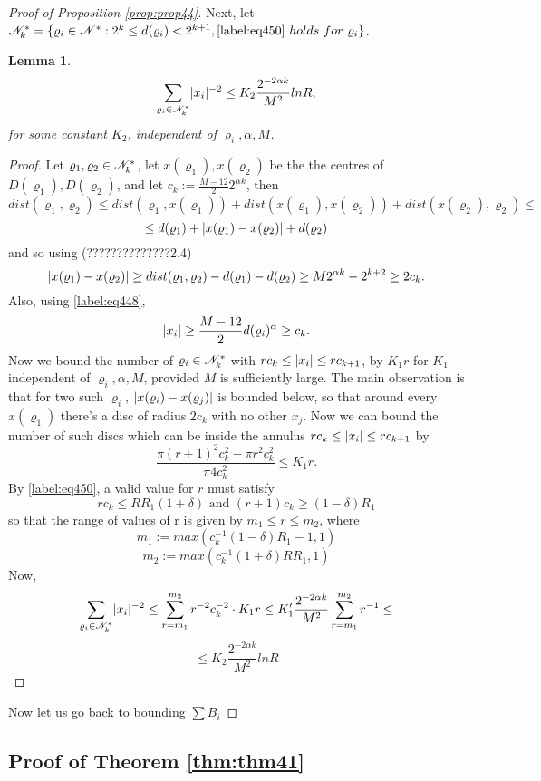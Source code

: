 \documentclass[11pt,reqno]{article}
\DeclarePairedDelimiter\abs{\lvert}{\rvert}%
\newtheorem{lemma}[thm]{Lemma}
\theoremstyle{definition}
\numberwithin{equation}{section}
\begin{document}
\begin{proof}[Proof of Proposition \eqref{prop:prop44}]
Next, let $\mathscr{N}_k^* = \{ \varrho_i \in \mathscr{N}^* : 2^k \leq d(\varrho_i) < 2^{k+1} , \eqref{label:eq450}\ holds\ for\ \varrho_i \}$.
\begin{lemma}
$$
\sum_{\varrho_i \in \ens_k^*} \abs{x_i}^{-2} \leq K_2 \frac{2^{-2\alpha k}}{M^2} lnR,
$$
for some constant $K_2$, independent of $\varrho_i, \alpha, M$.
\end{lemma}
\begin{proof}
Let $\varrho_1, \varrho_2 \in \mathscr{N}_k^*$, let $x(\varrho_1), x(\varrho_2)$ be the the centres of $D(\varrho_1), D(\varrho_2)$, and let $c_k:=\frac{M-12}{2}2^{\alpha k}$, then
$$
dist(\varrho_1, \varrho_2) \leq dist(\varrho_1, x(\varrho_1)) + dist(x(\varrho_1), x(\varrho_2)) + dist(x(\varrho_2), \varrho_2) \leq 
$$
$$
\leq d(\varrho_1) + \abs{x(\varrho_1) - x(\varrho_2)} + d(\varrho_2)
$$
and so using (??????????????2.4)
$$
\abs{x(\varrho_1) - x(\varrho_2)} \geq  dist(\varrho_1, \varrho_2) - d(\varrho_1) - d(\varrho_2) \geq M2^{\alpha k} - 2^{k+2} \geq 2c_k.
$$
Also, using \eqref{label:eq448}, 
$$
\abs{x_i} \geq \frac{M-12}{2} d(\varrho_i)^\alpha \geq c_k .
$$
Now we bound the number of $\varrho_i \in \mathscr{N}_k^*$ with $rc_k \leq \abs{x_i} \leq rc_{k+1}$, by $K_1r$ for $K_1$ independent of $\varrho_i, \alpha, M$, provided $M$ is sufficiently 
large. The main observation is that for two such $\varrho_i$, $\abs{x(\varrho_i) - x(\varrho_j)}$ is bounded below, so that around every $x(\varrho_1)$ there's a disc of radius $2c_k$ with no other $x_j$. Now we can bound the number of such discs which can be inside the annulus $rc_k \leq \abs{x_i} \leq rc_{k+1}$ by
$$
\frac{\pi(r+1)^2 c_k^2 - \pi r^2 c_k^2}{\pi 4 c_k^2} \leq K_1r.
$$
By \eqref{label:eq450}, a valid value for $r$ must satisfy
$$
rc_k \leq RR_1(1+\delta)
\text{ and }
(r+1) c_k \geq (1-\delta) R_1
$$
so that the range of values of r is given by $m_1 \leq r \leq m_2$, where
$$
m_1 := max(c_k^{-1} (1-\delta)R_1 - 1, 1)
$$
$$
m_2 := max(c_k^{-1} (1+\delta)RR_1, 1)
$$
Now,
$$
\sum_{\varrho_i \in \ens_k^*} \abs{x_i}^{-2} \leq 
\sum_{r=m_1}^{m_2} r^{-2}c_k^{-2} \cdot K_1r \leq 
K_1^\prime \frac{2^{-2\alpha k}}{M^2} \sum_{r=m_1}^{m_2} r^{-1} \leq 
$$
$$
\leq K_2 \frac{2^{-2\alpha k}}{M^2} lnR
$$
\end{proof}

Now let us go back to bounding $\sum B_i$





\end{proof}





\subsection{Proof of Theorem \eqref{thm:thm41}}
\end{document}
